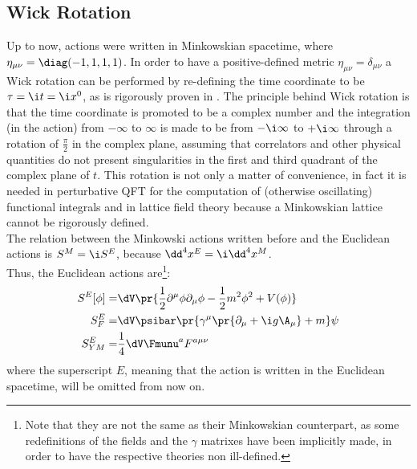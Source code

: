 \begin{comment}
\\Everything that has been said for $\SUN$ can be also extended to $\mathit{SO}(N)$ by replacing \emph{unitary} with \emph{orthogonal} and \emph{traceless} with \emph{antisymmetric}. In fact, this discussion can be made for every compact\footnote{Compactness, \ie $\Tr{T^aT^b}$ positive defined, is required in order to have a bounded from below Hamiltonian.} group, such as the symplectic group $\mathit{Sp}(2N)$ and the five exceptional Lie groups $\mathit{G}(2)$, $\spF$, $\mathit{E}(6)$, $\mathit{E}(7)$ and $\mathit{E}(8)$.
\end{comment}

\subsection{Wick Rotation}
Up to now, actions were written in Minkowskian spacetime, where $\eta_{\mu\nu} = \diag(-1,1,1,1)$. In order to have a positive-defined metric $\eta_{\mu\nu} = \delta_{\mu\nu}$ a Wick rotation can be performed by re-defining the time coordinate to be $\tau = \i t = \i x^0$, as is rigorously proven in \cite{SCHLINGEMANN_1999}.
The principle behind Wick rotation is that the time coordinate is promoted to be a complex number and the integration (in the action) from $-\infty$ to $\infty$ is made to be from $-\i\infty$ to $+\i\infty$ through a rotation of $\frac\pi2$ in the complex plane, assuming that correlators and other physical quantities do not present singularities in the first and third quadrant of the complex plane of $t$.
This rotation is not only a matter of convenience, in fact it is needed in perturbative QFT for the computation of (otherwise oscillating) functional integrals and in lattice field theory because a Minkowskian lattice cannot be rigorously defined.\\
The relation between the Minkowski actions written before and the Euclidean actions is $S^M = \i S^E$, because $\dd^4x^E = \i \dd^4x^M$.\\
Thus, the Euclidean actions are\footnote{Note that they are not the same as their Minkowskian counterpart, as some redefinitions of the fields and the $\gamma$ matrixes have been implicitly made, in order to have the respective theories non ill-defined.}:
\begin{align}
    S^E[\phi] =& \dV \pr{\frac12\partial^\mu\phi\partial_\mu\phi-\frac12m^2\phi^2+V(\phi)} \label{1:ScalarActionEuclidean}\\
    S^E_F =& \dV\psibar\pr{\gamma^\mu\pr{\partial_\mu+\i g \A_\mu} + m}\psi \label{1:FerionActionEuclidean}\\
    S^E_{YM} =& \frac14 \dV \Fmunu^a F^{a\mu\nu} \label{1:YMActionEuclidean}
\end{align}
where the superscript $E$, meaning that the action is written in the Euclidean spacetime, will be omitted from now on.

